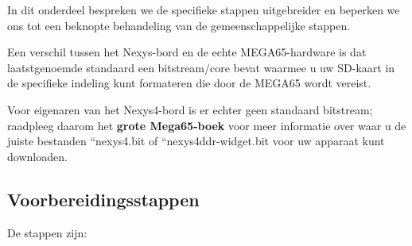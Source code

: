 In dit onderdeel bespreken we de specifieke stappen uitgebreider en beperken we ons tot een beknopte behandeling van de gemeenschappelijke stappen.

Een verschil tussen het Nexys-bord en de echte MEGA65-hardware is dat laatstgenoemde standaard een bitstream/core bevat waarmee u uw SD-kaart in de specifieke indeling kunt formateren die door de MEGA65 wordt vereist.

Voor eigenaren van het Nexys4-bord is er echter geen standaard bitstream; raadpleeg daarom het {\bf grote Mega65-boek} voor meer informatie over waar u de juiste bestanden ``nexys4.bit of ``nexys4ddr-widget.bit voor uw apparaat kunt downloaden.

\subsection{Voorbereidingsstappen}

De stappen zijn:

